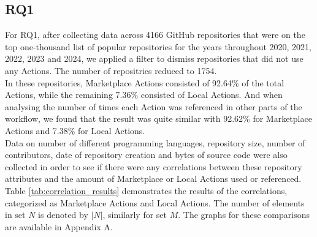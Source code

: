 \documentclass[conference]{IEEEtran}
\begin{document}
  \subsection{RQ1}
      For RQ1, after collecting data across 4166 GitHub repositories that were on the top one-thousand list of popular repositories for the years throughout 2020, 2021, 2022, 2023 and 2024, we applied a filter to dismiss repositories that did not use any Actions. The number of repositries reduced to 1754. \\ 
      In these repositories, Marketplace Actions consisted of 92.64\% of the total Actions, while the remaining 7.36\% consisted of Local Actions. And when analysing the number of times each Action was referenced in other parts of the workflow, we found that the result was quite similar with 92.62\% for Marketplace Actions and 7.38\% for Local Actions.\\ 
	Data on number of different programming languages, repository size, number of contributors, date of repository creation and bytes of source code were also collected in order to see if there were any correlations between these repository attributes and the amount of Marketplace or Local Actions used or referenced. Table \ref{tab:correlation_results} demonstrates the results of the correlations, categorized as Marketplace Actions and Local Actions. The number of elements in set $N$ is denoted by $|N|$, similarly for set $M$. The graphs for these comparisons are available in Appendix A.\\
\end{document}
